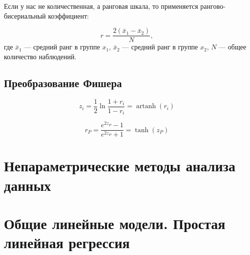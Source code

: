 \documentclass[
  letterpaper,
  DIV=11,
  numbers=noendperiod]{scrreprt}
\newcommand{\const}{\text{const}}
\newcommand{\lp}{\left(}
\newcommand{\rp}{\right)}
\newcommand{\lb}{\left[}
\newcommand{\rb}{\right]}
\newcommand*\circled[1]{\tikz[baseline=(char.base)]{
            \node[shape=circle,draw,inner sep=2pt] (char) {#1};}}
\newcommand{\xor}{\,\text{XOR}\,}
\newcommand{\setN}{\mathbb{N}}
\newcommand{\setNo}{\mathbb{N}_{0}}
\newcommand{\setZ}{\mathbb{Z}}
\newcommand{\setQ}{\mathbb{Q}}
\newcommand{\setR}{\mathbb{R}}
\newcommand{\setC}{\mathbb{C}}
\newcommand{\vm}[1]{\mathbf{#1}} %
\newcommand{\prob}{\mathbb{P}}
\newcommand{\expect}{\mathbb{E}}
\newcommand{\disp}{\mathbb{D}}
\newcommand{\var}{\mathrm{var}}
\newcommand{\cov}{\mathrm{cov}}
\newcommand{\cor}{\mathrm{cor}}
\newcommand{\se}{\mathrm{se}}
\newcommand{\sd}{\mathrm{sd}}
\newcommand{\iid}{\text{i.i.d}}
\theoremstyle{definition}
\theoremstyle{remark}
\begin{document}
Если у нас не количественная, а ранговая шкала, то применяется
рангово-бисериальный коэффициент:

\[
r = \frac{2(\bar x_1 - \bar x_2)}{N},
\] где \(\bar x_1\) --- средний ранг в группе \(x_1\), \(\bar x_2\) ---
средний ранг в группе \(x_2\), \(N\) --- общее количество наблюдений.

\section{Преобразование Фишера}\label{andan-cor-fisher-transform}

\[
z_i = \frac{1}{2} \ln \frac{1 + r_i}{1 - r_i} = \mathop{\mathrm{artanh}}(r_i)
\]

\[
r_P = \dfrac{e^{2z_P} - 1}{e^{2z_P} + 1} = \tanh(z_P)
\]


\chapter{Непараметрические методы анализа данных}\label{andan-nonparam}


\chapter{Общие линейные модели. Простая линейная
регрессия}\label{andan-simplelinear}

\usepackage{xcolor}
\usepackage{soul}
\usepackage{amsmath, amsfonts}

\newcommand{\const}{\text{const}}
\newcommand{\lp}{\left(}
\newcommand{\rp}{\right)}
\newcommand{\lb}{\left[}
\newcommand{\rb}{\right]}

\newcommand*\circled[1]{\tikz[baseline=(char.base)]{
            \node[shape=circle,draw,inner sep=2pt] (char) {#1};}}

\newcommand{\xor}{\,\text{XOR}\,}

\newcommand{\setN}{\mathbb{N}}
\newcommand{\setNo}{\mathbb{N}_{0}}
\newcommand{\setZ}{\mathbb{Z}}
\newcommand{\setQ}{\mathbb{Q}}
\newcommand{\setR}{\mathbb{R}}
\newcommand{\setC}{\mathbb{C}}

\newcommand{\vm}[1]{\mathbf{#1}}

\newcommand{\Falg}{\mathcal{F}}
\newcommand{\prob}{\mathbb{P}}
\newcommand{\expect}{\mathbb{E}}
\newcommand{\disp}{\mathbb{D}}
\newcommand{\var}{\text{var}}
\newcommand{\cov}{\text{cov}}
\newcommand{\cor}{\text{cor}}
\newcommand{\se}{\text{se}}
\newcommand{\sd}{\text{sd}}
\newcommand{\iid}{\text{i.i.d}}
\end{document}
